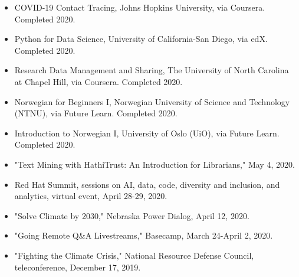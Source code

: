 \documentclass[10pt]{article}
\begin{document}
\begin{itemize}
  \item COVID-19 Contact Tracing, Johns Hopkins University, via Coursera. Completed 2020.
  
  \item Python for Data Science, University of California-San Diego, via edX. Completed 2020.
  
  \item Research Data Management and Sharing, The University of North Carolina at Chapel Hill, via Coursera. Completed 2020.
  
  \item Norwegian for Beginners I, Norwegian University of Science and Technology (NTNU), via Future Learn. Completed 2020.
  
  \item Introduction to Norwegian I, University of Oslo (UiO), via Future Learn. Completed 2020.
  
  \item "Text Mining with HathiTrust: An Introduction for Librarians," May 4, 2020.
  
  \item Red Hat Summit, sessions on AI, data, code, diversity and inclusion, and analytics, virtual event, April 28-29, 2020.
  
  \item "Solve Climate by 2030," Nebraska Power Dialog, April 12, 2020.
  
  \item "Going Remote Q\&A Livestreams," Basecamp, March 24-April 2, 2020.
  
  \item "Fighting the Climate Crisis," National Resource Defense Council, teleconference, December 17, 2019.
\end{itemize}
\end{document}
